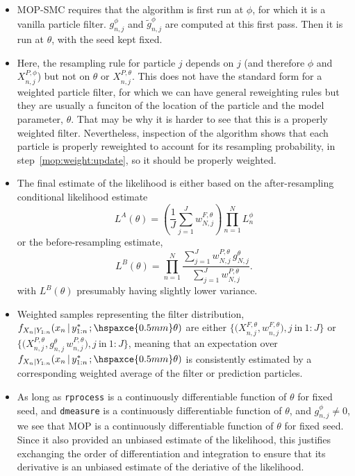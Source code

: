 \documentclass[12p]{article}
\newcommand\giventh{{\hspace{0.5mm};\hspaxce{0.5mm}}}
\newcommand\seq[2]{{#1}\!:\!{#2}}
\newcommand\given{{\,\vert\,}}
\begin{document}
\begin{itemize}
\item MOP-SMC requires that the algorithm is first run at $\phi$, for which it is a vanilla particle filter.  $g^{\phi}_{n,j}$ and $\tilde g^{\phi}_{n,j}$ are computed at this first pass. Then it is run at $\theta$, with the seed kept fixed.

\item Here, the resampling rule for particle $j$ depends on $j$ (and therefore $\phi$ and $X^{P,\phi}_{n,j}$) but not on $\theta$ or  $X^{P,\theta}_{n,j}$. This does not have the standard form for a weighted particle filter, for which we can have general reweighting rules but they are usually a funciton of the location of the particle and the model parameter, $\theta$. That may be why it is harder to see that this is a properly weighted filter. Nevertheless, inspection of the algorithm shows that each particle is properly reweighted to account for its resampling probability, in step~\ref{mop:weight:update}, so it should be properly weighted.

\item The final estimate of the likelihood is either based on the after-resampling conditional likelihood estimate
  \begin{equation} \label{mop:likA}
    L^A(\theta) = \left(\frac{1}{J}\sum_{j=1}^J w^{F,\theta}_{N,j} \right)
    \prod_{n=1}^N L_n^\phi
  \end{equation}
  or the before-resampling estimate,
 \begin{equation}\label{mop:likB}
   L^B(\theta) = \prod_{n=1}^N \frac{\sum_{j=1}^J w^{P,\theta}_{N,j} \, g^{\theta}_{N,j}}{\sum_{j=1}^J w^{P,\theta}_{N,j}}.
  \end{equation}
 with $L^B(\theta)$ presumably having slightly lower variance.

\item Weighted samples representing the filter distribution,
  $f_{X_n|Y_{1:n}}(x_n \given y^*_{1:n} \giventh \theta)$
  are either
  $\big\{\big(X^{F,\theta}_{n,j},w^{F,\theta}_{n,j}\big),  j\ \mathrm{in}\ \seq{1}{J}\big\}$
  or
  $\big\{\big(X^{P,\theta}_{n,j}, g^\theta_{n,j} \, w^{P,\theta}_{n,j}\big),  j\ \mathrm{in}\ \seq{1}{J}\big\}$,
  meaning that an expectation over $f_{X_n|Y_{1:n}}(x_n \given y^*_{1:n} \giventh \theta)$ is consistently estimated by a corresponding weighted average of the filter or prediction particles.

  \item As long as \texttt{rprocess} is a continuously differentiable function of $\theta$ for fixed seed, and \texttt{dmeasure} is a continuously differentiable function of $\theta$, and $g^{\phi}_{n,j}\neq 0$, we see that MOP is a continuously differentiable function of $\theta$ for fixed seed. Since it also provided an unbiased estimate of the likelihood, this justifies exchanging the order of differentiation and integration to ensure that its derivative is an unbiased estimate of the deriative of the likelihood.


\end{itemize}
\end{document}
